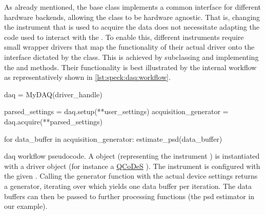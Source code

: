 As already mentioned, the  base class implements a common interface for different hardware backends, allowing the  class to be hardware agnostic.
That is, changing the instrument that is used to acquire the data does not necessitate adapting the code used to interact with the .
To enable this, different instruments require small wrapper drivers that map the functionality of their actual driver onto the interface dictated by the  class.
This is achieved by subclassing  and implementing the  and  methods.
Their functionality is best illustrated by the internal workflow as representatively shown in \cref{lst:speck:daq:workflow}.

\begin{listing}[htpb]
    \begin{py}
        daq = MyDAQ(driver_handle)

        parsed_settings = daq.setup(**user_settings)
        acquisition_generator = daq.acquire(**parsed_settings)

        for data_buffer in acquisition_generator:
            estimate_psd(data_buffer)
    \end{py}
    \caption[\gls{daq} workflow pseudocode]{
        \gls{daq} workflow pseudocode.
        A  object (representing the instrument ) is instantiated with a driver object (for instance a \href{https://github.com/microsoft/qcodes}{QCoDeS} ).
        The instrument is configured with the given .
        Calling the generator function  with the actual device settings returns a generator, iterating over which yields one data buffer per iteration.
        The data buffers can then be passed to further processing functions (the \gls{psd} estimator in our example).
    }
    \label{lst:speck:daq:workflow}
\end{listing}

